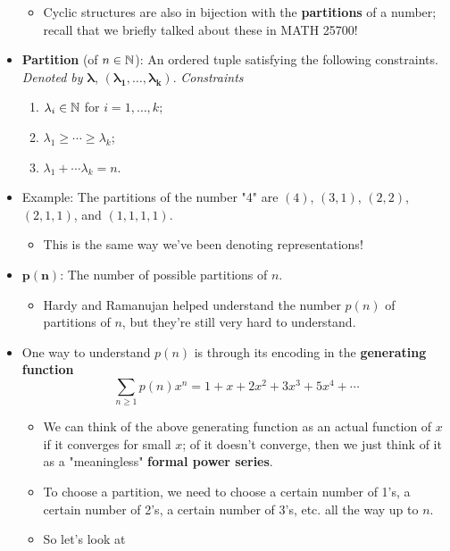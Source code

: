 \documentclass[../notes.tex]{subfiles}
\begin{document}
\begin{itemize}
\begin{itemize}
        \item Cyclic structures are also in bijection with the \textbf{partitions} of a number; recall that we briefly talked about these in MATH 25700!
    \end{itemize}
    \item \textbf{Partition} (of $n\in\mathbb{N}$): An ordered tuple satisfying the following constraints. \emph{Denoted by} $\bm{\lambda}$, $\bm{(\lambda_1,\ldots,\lambda_k)}$. \emph{Constraints}
    \begin{enumerate}
        \item $\lambda_i\in\mathbb{N}$ for $i=1,\dots,k$;
        \item $\lambda_1\geq\cdots\geq\lambda_k$;
        \item $\lambda_1+\cdots\lambda_k=n$.
    \end{enumerate}
    \item Example: The partitions of the number "4" are $(4)$, $(3,1)$, $(2,2)$, $(2,1,1)$, and $(1,1,1,1)$.
    \begin{itemize}
        \item This is the same way we've been denoting representations!
    \end{itemize}
    \item $\bm{p(n)}$: The number of possible partitions of $n$.
    \begin{itemize}
        \item Hardy and Ramanujan helped understand the number $p(n)$ of partitions of $n$, but they're still very hard to understand.
    \end{itemize}
    \item One way to understand $p(n)$ is through its encoding in the \textbf{generating function}
    \begin{equation*}
        \sum_{n\geq 1}p(n)x^n = 1+x+2x^2+3x^3+5x^4+\cdots
    \end{equation*}
    \begin{itemize}
        \item We can think of the above generating function as an actual function of $x$ if it converges for small $x$; of it doesn't converge, then we just think of it as a "meaningless" \textbf{formal power series}.
        \item To choose a partition, we need to choose a certain number of 1's, a certain number of 2's, a certain number of 3's, etc. all the way up to $n$.
        \item So let's look at
        \begin{equation*}

\end{equation*}
\end{itemize}
\end{itemize}
\end{document}
